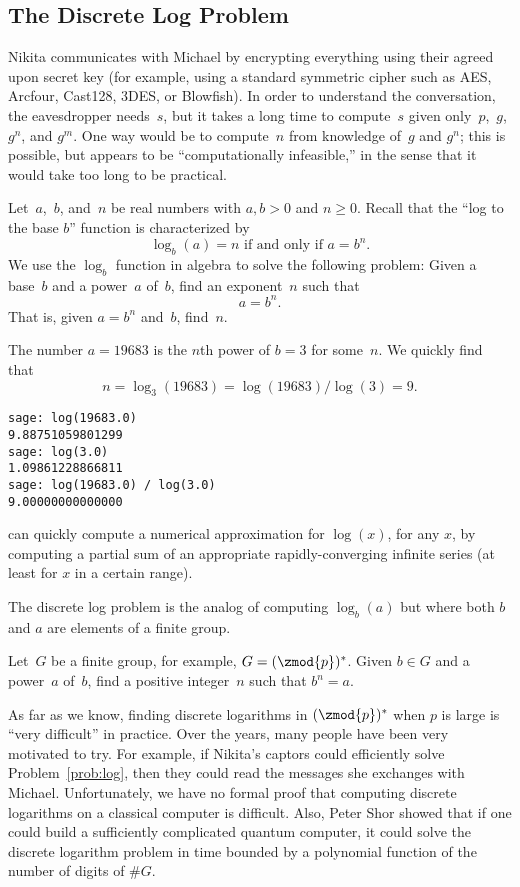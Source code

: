 \subsection{The Discrete Log Problem}\label{sec:dlog}
 Nikita communicates with Michael by
encrypting everything using their agreed upon secret key (for example, using
a standard symmetric cipher such as AES, Arcfour, Cast128, 3DES, or
Blowfish).  In order to understand the conversation, the eavesdropper
needs~$s$, but it takes a long time to compute~$s$ given
only~$p$,~$g$, $g^n$, and $g^m$.  One way would be to compute~$n$ from
knowledge of~$g$ and $g^n$; this is possible, but appears to be
``computationally infeasible,'' in the sense that it would take too
long to be practical.

Let~$a$,~$b$, and~$n$ be real numbers with
$a,b>0$ and $n\geq 0$.
Recall that the ``log to the base $b$'' function is
characterized by
$$
  \log_b(a) = n \text{ if and only if } a=b^n.
$$
We use the $\log_b$ function
in algebra to solve
the following problem:
Given a base~$b$ and a power~$a$ of~$b$,
find an exponent~$n$ such that
$$
   a = b^n.
$$
That is, given $a=b^n$ and~$b$, find~$n$.

\begin{sg}
The number $a = 19683$ is the
$n$th power of $b=3$ for some~$n$. We quickly find
that
$$
  n = \log_3(19683) = \log(19683) / \log(3) = 9.
$$
\begin{verbatim}
sage: log(19683.0)
9.88751059801299
sage: log(3.0)
1.09861228866811
sage: log(19683.0) / log(3.0)
9.00000000000000
\end{verbatim}
\sage can quickly compute a numerical approximation for $\log(x)$, for
any $x$, by computing a partial sum of an appropriate
rapidly-converging infinite series (at least for $x$ in a certain
range).
\end{sg}

The discrete log problem is the analog of computing $\log_b(a)$  but
where both $b$ and $a$ are elements of a finite group.
\begin{problem}\label{prob:log}
Let~$G$ be a finite group, for example, $G=(\zmod{p})^*$.  Given $b\in G$ and
a power~$a$ of~$b$, find a positive integer~$n$ such that
$b^n=a$.
\end{problem}

As far as we know, finding discrete logarithms in $(\zmod{p})^*$
when $p$ is large is
``very difficult'' in practice.  Over the years, many people have been
very motivated to try.  For example, if Nikita's captors could
efficiently solve Problem~\ref{prob:log}, then they could read the
messages she exchanges with Michael.  Unfortunately, we have no formal
proof that computing discrete logarithms on a classical computer is
difficult.   Also, Peter
Shor \cite{shor} showed that if one could build a
sufficiently complicated quantum computer, it
could solve the discrete logarithm problem in time bounded by a
polynomial function of the number of digits of $\#G$.

